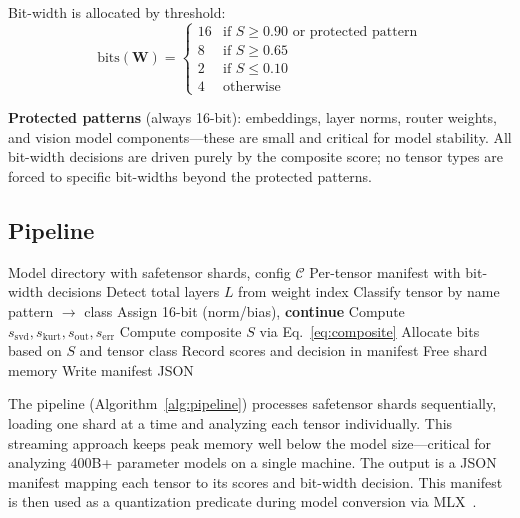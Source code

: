 \documentclass{article}
\begin{document}
Bit-width is allocated by threshold:
\begin{equation}
    \text{bits}(\mathbf{W}) = \begin{cases}
        16 & \text{if } S \geq 0.90 \text{ or protected pattern} \\
        8 & \text{if } S \geq 0.65 \\
        2 & \text{if } S \leq 0.10 \\
        4 & \text{otherwise}
    \end{cases}
\end{equation}

\textbf{Protected patterns} (always 16-bit): embeddings, layer norms, router weights, and vision model components---these are small and critical for model stability. All bit-width decisions are driven purely by the composite score; no tensor types are forced to specific bit-widths beyond the protected patterns.

\subsection{Pipeline}

\begin{algorithm}[t]
\caption{SWAN Analysis Pipeline}
\label{alg:pipeline}
\begin{algorithmic}[1]
\REQUIRE Model directory with safetensor shards, config $\mathcal{C}$
\ENSURE Per-tensor manifest with bit-width decisions
\STATE Detect total layers $L$ from weight index
        \STATE Classify tensor by name pattern $\rightarrow$ class
            \STATE Assign 16-bit (norm/bias), \textbf{continue}
        \ENDIF
        \STATE Compute $s_\text{svd}, s_\text{kurt}, s_\text{out}, s_\text{err}$
        \STATE Compute composite $S$ via Eq.~\ref{eq:composite}
        \STATE Allocate bits based on $S$ and tensor class
        \STATE Record scores and decision in manifest
    \ENDFOR
    \STATE Free shard memory
\ENDFOR
\STATE Write manifest JSON
\end{algorithmic}
\end{algorithm}

The pipeline (Algorithm~\ref{alg:pipeline}) processes safetensor shards sequentially, loading one shard at a time and analyzing each tensor individually. This streaming approach keeps peak memory well below the model size---critical for analyzing 400B+ parameter models on a single machine. The output is a JSON manifest mapping each tensor to its scores and bit-width decision. This manifest is then used as a quantization predicate during model conversion via MLX~\cite{mlx2023}.
\end{document}
